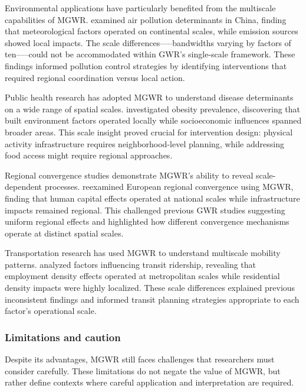 \documentclass[smallextended, natbib]{svjour3}       %
\begin{document}
Environmental applications have particularly benefited from the multiscale capabilities of MGWR. 
\cite{yang2020exploring} examined air pollution determinants in China, finding that meteorological factors operated on continental scales, while emission sources showed local impacts. 
The scale differences--—bandwidths varying by factors of ten—--could not be accommodated within GWR's single-scale framework. 
These findings informed pollution control strategies by identifying interventions that required regional coordination versus local action.

Public health research has adopted MGWR to understand disease determinants on a wide range of spatial scales. 
\cite{oshan2020targeting} investigated obesity prevalence, discovering that built environment factors operated locally while socioeconomic influences spanned broader areas. 
This scale insight proved crucial for intervention design: physical activity infrastructure requires neighborhood-level planning, while addressing food access might require regional approaches.

Regional convergence studies demonstrate MGWR's ability to reveal scale-dependent processes. 
\cite{murakami2021spatially} reexamined European regional convergence using MGWR, finding that human capital effects operated at national scales while infrastructure impacts remained regional. 
This challenged previous GWR studies suggesting uniform regional effects and highlighted how different convergence mechanisms operate at distinct spatial scales.

Transportation research has used MGWR to understand multiscale mobility patterns. 
\cite{zhang2021multiscale} analyzed factors influencing transit ridership, revealing that employment density effects operated at metropolitan scales while residential density impacts were highly localized. 
These scale differences explained previous inconsistent findings and informed transit planning strategies appropriate to each factor's operational scale.


\subsubsection*{Limitations and caution}

Despite its advantages, MGWR still faces challenges that researchers must consider carefully. 
These limitations do not negate the value of MGWR, but rather define contexts where careful application and interpretation are required.
\end{document}
